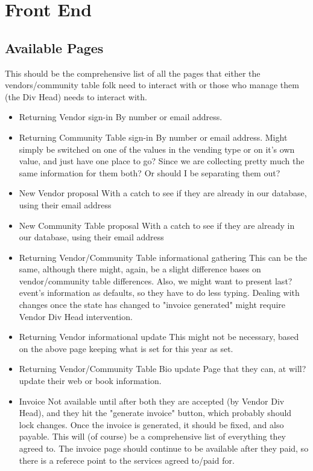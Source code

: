 \documentclass[captions=tablesignature]{scrartcl}
\begin{document}
\section{Front End}
\label{sec-3}
\subsection{Available Pages}
\label{sec-3-1}
This should be the comprehensive list of all the pages that either
the vendors/community table folk need to interact with or those who
manage them (the Div Head) needs to interact with.
\begin{itemize}
\item Returning Vendor sign-in
\label{sec-3-1-1}
By number or email address.

\item Returning Community Table sign-in
\label{sec-3-1-2}
By number or email address.  Might simply be switched on one of
the values in the vending type or on it's own value, and just have
one place to go?  Since we are collecting pretty much the same
information for them both?  Or should I be separating them out?

\item New Vendor proposal
\label{sec-3-1-3}
With a catch to see if they are already in our database, using
their email address

\item New Community Table proposal
\label{sec-3-1-4}
With a catch to see if they are already in our database, using
their email address

\item Returning Vendor/Community Table informational gathering
\label{sec-3-1-5}
This can be the same, although there might, again, be a slight
difference bases on vendor/community table differences.  Also, we
might want to present last? event's information as defaults, so
they have to do less typing. Dealing with changes once the state
has changed to "invoice generated" might require Vendor Div Head
intervention.

\item Returning Vendor informational update
\label{sec-3-1-6}
This might not be necessary, based on the above page keeping what
is set for this year as set.

\item Returning Vendor/Community Table Bio update
\label{sec-3-1-7}
Page that they can, at will? update their web or book information.

\item Invoice
\label{sec-3-1-8}
Not available until after both they are accepted (by Vendor
Div Head), and they hit the "generate invoice" button, which
probably should lock changes.  Once the invoice is generated, it
should be fixed, and also payable.
This will (of course) be a comprehensive list of everything they
agreed to.  The invoice page should continue to be available after
they paid, so there is a referece point to the services agreed
to/paid for.


\end{itemize}
\end{document}

